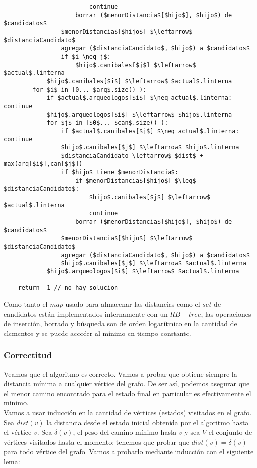 \begin{lstlisting}
                        continue
                    borrar ($menorDistancia$[$hijo$], $hijo$) de $candidatos$
                $menorDistancia$[$hijo$] $\leftarrow$ $distanciaCandidato$
                agregar ($distanciaCandidato$, $hijo$) a $candidatos$
                if $i \neq j$:
                    $hijo$.canibales[$j$] $\leftarrow$ $actual$.linterna
            $hijo$.canibales[$i$] $\leftarrow$ $actual$.linterna
        for $i$ in [0... $arq$.size() ):
            if $actual$.arqueologos[$i$] $\neq actual$.linterna: continue
            $hijo$.arqueologos[$i$] $\leftarrow$ $hijo$.linterna
            for $j$ in [$0$... $can$.size() ):
                if $actual$.canibales[$j$] $\neq actual$.linterna: continue
                $hijo$.canibales[$j$] $\leftarrow$ $hijo$.linterna
                $distanciaCandidato \leftarrow$ $dist$ + max(arq[$i$],can[$j$])
                if $hijo$ tiene $menorDistancia$:
                    if $menorDistancia$[$hijo$] $\leq$ $distanciaCandidato$:
                        $hijo$.canibales[$j$] $\leftarrow$ $actual$.linterna
                        continue
                    borrar ($menorDistancia$[$hijo$], $hijo$) de $candidatos$
                $menorDistancia$[$hijo$] $\leftarrow$ $distanciaCandidato$
                agregar ($distanciaCandidato$, $hijo$) a $candidatos$
                $hijo$.canibales[$j$] $\leftarrow$ $actual$.linterna
            $hijo$.arqueologos[$i$] $\leftarrow$ $actual$.linterna

    return -1 // no hay solucion

\end{lstlisting}

Como tanto el $map$ usado para almacenar las distancias como el $set$ de candidatos están implementados internamente con un $RB-tree$, las operaciones de inserción, borrado y búsqueda son de orden logarítmico en la cantidad de elementos y se puede acceder al mínimo en tiempo constante.

    \subsubsection{Correctitud}

Veamos que el algoritmo es correcto. Vamos a probar que obtiene siempre la distancia mínima a cualquier vértice del grafo. De ser así, podemos asegurar que el menor camino encontrado para el estado final en particular es efectivamente el mínimo.
\\

Vamos a usar inducción en la cantidad de vértices (estados) visitados en el grafo.
Sea $dist(v)$ la distancia desde el estado inicial obtenida por el algoritmo hasta el vértice $v$. Sea $\delta(v)$, el peso del camino mínimo hasta $v$ y sea $V$ el conjunto de vértices visitados hasta el momento: tenemos que probar que $dist(v) = \delta(v)$ para todo vértice del grafo. Vamos a probarlo mediante inducción con el siguiente lema:
\\

